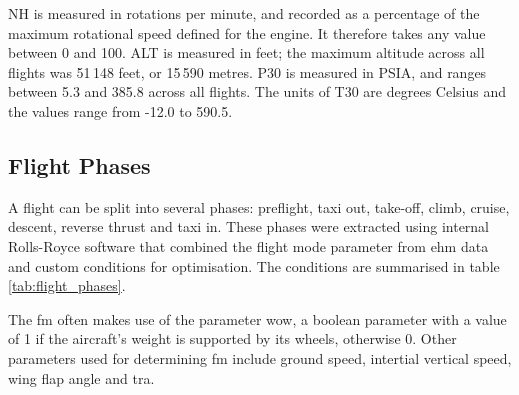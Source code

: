 NH is measured in rotations per minute, and recorded as a percentage of the maximum rotational speed defined for the engine. It therefore takes any value between 0 and 100. ALT is measured in feet; the maximum altitude across all flights was 51\,148 feet, or 15\,590 metres. P30 is measured in PSIA, and ranges between 5.3 and 385.8 across all flights. The units of T30 are degrees Celsius and the values range from -12.0 to 590.5.

\subsection{Flight Phases} \label{sec:phases}
A flight can be split into several phases: preflight, taxi out, take-off, climb, cruise, descent, reverse thrust and taxi in. These phases were extracted using internal Rolls-Royce software \cite[]{konig_br725stats_2018} that combined the flight mode parameter from \ac{ehm} data \cite[]{reischl_br700-725a1-12_2014} and custom conditions for optimisation. The conditions are summarised in table \ref{tab:flight_phases}.

The \ac{fm} often makes use of the parameter \ac{wow}, a boolean parameter with a value of 1 if the aircraft's weight is supported by its wheels, otherwise 0. Other parameters used for determining \ac{fm} include ground speed, intertial vertical speed, wing flap angle and \ac{tra}.

